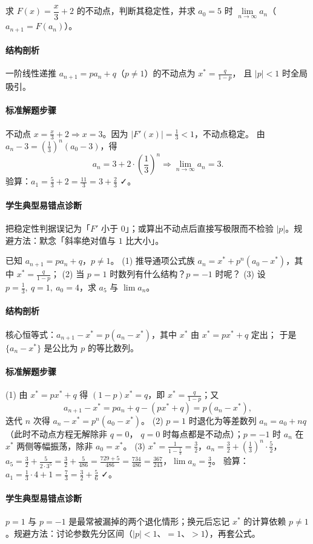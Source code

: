 \begin{problem}
求 $F(x)=\dfrac x3+2$ 的不动点，判断其稳定性，并求 $a_0=5$ 时
$\lim\limits_{n\to\infty}a_n$（$a_{n+1}=F(a_n)$）。
\end{problem}
\begin{solution}
\paragraph{结构剖析}
一阶线性递推 $a_{n+1}=pa_n+q$（$p\neq1$）的不动点为 $x^*=\frac q{1-p}$，
且 $|p|<1$ 时全局吸引。
\paragraph{标准解题步骤}
不动点 $x=\frac x3+2\Rightarrow x=3$。因为 $|F'(x)|=\frac13<1$，不动点稳定。
由 $a_n-3=\left(\frac13\right)^n(a_0-3)$，得
\[
  a_n=3+2\cdot\left(\frac13\right)^n\Rightarrow\lim_{n\to\infty}a_n=3.
\]
验算：$a_1=\frac53+2=\frac{11}3=3+\frac23$ ✓。
\paragraph{学生典型易错点诊断}
把稳定性判据误记为「$F'$ 小于 $0$」；或算出不动点后直接写极限而不检验
$|p|$。规避方法：默念「斜率绝对值与 $1$ 比大小」。
\end{solution}

\begin{problem}
已知 $a_{n+1}=pa_n+q$，$p\neq1$。
(1) 推导通项公式族 $a_n=x^*+p^n(a_0-x^*)$，其中 $x^*=\frac q{1-p}$；
(2) 当 $p=1$ 时数列有什么结构？$p=-1$ 时呢？
(3) 设 $p=\frac13,\ q=1,\ a_0=4$，求 $a_5$ 与 $\lim a_n$。
\end{problem}
\begin{solution}
\paragraph{结构剖析}
核心恒等式：$a_{n+1}-x^*=p(a_n-x^*)$，其中 $x^*$ 由 $x^*=px^*+q$ 定出；
于是 $\{a_n-x^*\}$ 是公比为 $p$ 的等比数列。
\paragraph{标准解题步骤}
(1) 由 $x^*=px^*+q$ 得 $(1-p)x^*=q$，即 $x^*=\frac q{1-p}$；又
\[
  a_{n+1}-x^*=pa_n+q-(px^*+q)=p(a_n-x^*),
\]
迭代 $n$ 次得 $a_n-x^*=p^n(a_0-x^*)$。
(2) $p=1$ 时退化为等差数列 $a_n=a_0+nq$（此时不动点方程无解除非 $q=0$，
$q=0$ 时每点都是不动点）；$p=-1$ 时 $a_n$ 在 $x^*$ 两侧等幅振荡，除非
$a_0=x^*$。
(3) $x^*=\frac1{1-\frac13}=\frac32$，$a_n=\frac32+\left(\frac13\right)^n\cdot\frac52$，
$a_5=\frac32+\frac{5}{2\cdot3^5}=\frac32+\frac{5}{486}=\frac{729+5}{486}
=\frac{734}{486}=\frac{367}{243}$，$\lim a_n=\frac32$。
验算：$a_1=\frac13\cdot4+1=\frac73=\frac32+\frac56$ ✓。
\paragraph{学生典型易错点诊断}
$p=1$ 与 $p=-1$ 是最常被漏掉的两个退化情形；换元后忘记 $x^*$ 的计算依赖
$p\neq1$。规避方法：讨论参数先分区间（$|p|<1$、$=1$、$>1$），再套公式。
\end{solution}

